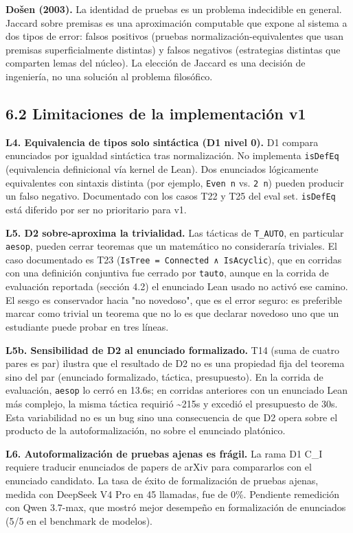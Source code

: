 \documentclass[12pt,a4paper]{article}
\theoremstyle{remark}
\begin{document}
\textbf{Došen (2003).} La identidad de pruebas es un problema indecidible en general. Jaccard sobre premisas es una aproximación computable que expone al sistema a dos tipos de error: falsos positivos (pruebas normalización-equivalentes que usan premisas superficialmente distintas) y falsos negativos (estrategias distintas que comparten lemas del núcleo). La elección de Jaccard es una decisión de ingeniería, no una solución al problema filosófico.


\subsection{6.2 Limitaciones de la implementación v1}

\textbf{L4. Equivalencia de tipos solo sintáctica (D1 nivel 0).} D1 compara enunciados por igualdad sintáctica tras normalización. No implementa \texttt{isDefEq} (equivalencia definicional vía kernel de Lean). Dos enunciados lógicamente equivalentes con sintaxis distinta (por ejemplo, \texttt{Even n} vs. \texttt{2 \mid n}) pueden producir un falso negativo. Documentado con los casos T22 y T25 del eval set. \texttt{isDefEq} está diferido por ser no prioritario para v1.


\textbf{L5. D2 sobre-aproxima la trivialidad.} Las tácticas de \texttt{T\_AUTO}, en particular \texttt{aesop}, pueden cerrar teoremas que un matemático no consideraría triviales. El caso documentado es T23 (\texttt{IsTree = Connected ∧ IsAcyclic}), que en corridas con una definición conjuntiva fue cerrado por \texttt{tauto}, aunque en la corrida de evaluación reportada (sección 4.2) el enunciado Lean usado no activó ese camino. El sesgo es conservador hacia "no novedoso", que es el error seguro: es preferible marcar como trivial un teorema que no lo es que declarar novedoso uno que un estudiante puede probar en tres líneas.

\textbf{L5b. Sensibilidad de D2 al enunciado formalizado.} T14 (suma de cuatro pares es par) ilustra que el resultado de D2 no es una propiedad fija del teorema sino del par (enunciado formalizado, táctica, presupuesto). En la corrida de evaluación, \texttt{aesop} lo cerró en 13.6s; en corridas anteriores con un enunciado Lean más complejo, la misma táctica requirió \textasciitilde{}215s y excedió el presupuesto de 30s. Esta variabilidad no es un bug sino una consecuencia de que D2 opera sobre el producto de la autoformalización, no sobre el enunciado platónico.


\textbf{L6. Autoformalización de pruebas ajenas es frágil.} La rama D1 C\_I requiere traducir enunciados de papers de arXiv para compararlos con el enunciado candidato. La tasa de éxito de formalización de pruebas ajenas, medida con DeepSeek V4 Pro en 45 llamadas, fue de 0\%. Pendiente remedición con Qwen 3.7-max, que mostró mejor desempeño en formalización de enunciados (5/5 en el benchmark de modelos).
\end{document}
